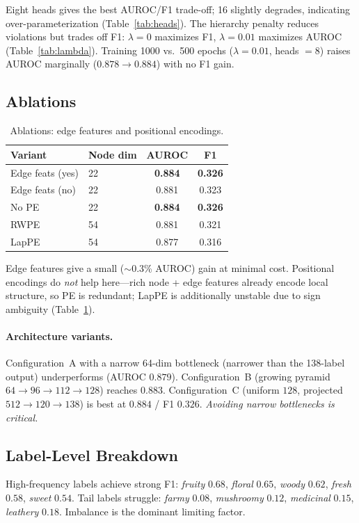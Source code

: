 \documentclass[10pt,twocolumn]{article}
\begin{document}
\noindent Eight heads gives the best AUROC/F1 trade-off; 16 slightly degrades, indicating over-parameterization (Table~\ref{tab:heads}). The hierarchy penalty reduces violations but trades off F1: $\lambda=0$ maximizes F1, $\lambda=0.01$ maximizes AUROC (Table~\ref{tab:lambda}). Training 1000 vs.\ 500 epochs ($\lambda=0.01$, heads $=8$) raises AUROC marginally ($0.878\!\rightarrow\!0.884$) with no F1 gain.

\subsection{Ablations}

\begin{table}[t]
\centering\small
\caption{Ablations: edge features and positional encodings.}
\label{tab:abl}
\begin{tabular}{llcc}
\toprule
\textbf{Variant} & \textbf{Node dim} & \textbf{AUROC} & \textbf{F1} \\
\midrule
Edge feats (yes) & 22 & \textbf{0.884} & \textbf{0.326} \\
Edge feats (no)  & 22 & 0.881 & 0.323 \\
\midrule
No PE            & 22 & \textbf{0.884} & \textbf{0.326} \\
RWPE             & 54 & 0.881 & 0.321 \\
LapPE            & 54 & 0.877 & 0.316 \\
\bottomrule
\end{tabular}
\end{table}

\noindent Edge features give a small ($\sim$0.3\% AUROC) gain at minimal cost. Positional encodings do \emph{not} help here---rich node + edge features already encode local structure, so PE is redundant; LapPE is additionally unstable due to sign ambiguity (Table~\ref{tab:abl}).

\paragraph{Architecture variants.} Configuration~A with a narrow 64-dim bottleneck (narrower than the 138-label output) underperforms (AUROC $0.879$). Configuration~B (growing pyramid $64\!\rightarrow\!96\!\rightarrow\!112\!\rightarrow\!128$) reaches $0.883$. Configuration~C (uniform $128$, projected $512\!\rightarrow\!120\!\rightarrow\!138$) is best at $0.884$ / F1 $0.326$. \emph{Avoiding narrow bottlenecks is critical.}

\subsection{Label-Level Breakdown}
High-frequency labels achieve strong F1: \emph{fruity} $0.68$, \emph{floral} $0.65$, \emph{woody} $0.62$, \emph{fresh} $0.58$, \emph{sweet} $0.54$. Tail labels struggle: \emph{farmy} $0.08$, \emph{mushroomy} $0.12$, \emph{medicinal} $0.15$, \emph{leathery} $0.18$. Imbalance is the dominant limiting factor.
\end{document}
